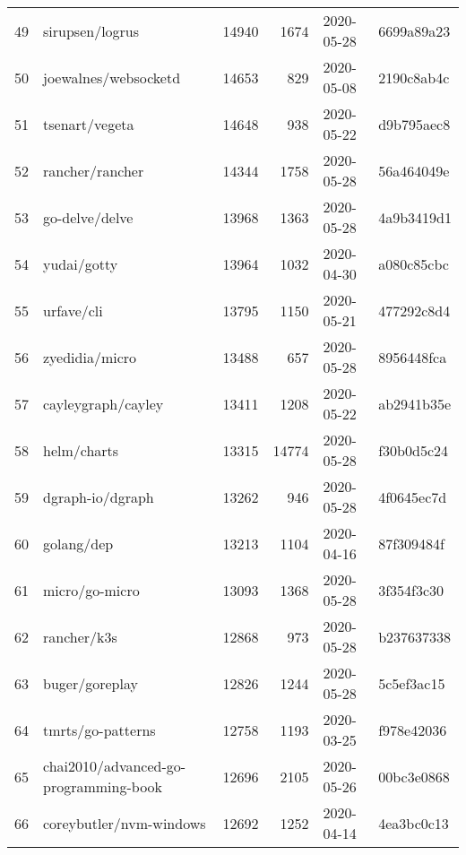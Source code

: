 \begin{longtable}{llrrll}
    49  &                                    sirupsen/logrus &  14940 &   1674 & 2020-05-28 &  6699a89a23 \\
    50  &                               joewalnes/websocketd &  14653 &    829 & 2020-05-08 &  2190c8ab4c \\
    51  &                                     tsenart/vegeta &  14648 &    938 & 2020-05-22 &  d9b795aec8 \\
    52  &                                    rancher/rancher &  14344 &   1758 & 2020-05-28 &  56a464049e \\
    53  &                                     go-delve/delve &  13968 &   1363 & 2020-05-28 &  4a9b3419d1 \\
    54  &                                        yudai/gotty &  13964 &   1032 & 2020-04-30 &  a080c85cbc \\
    55  &                                         urfave/cli &  13795 &   1150 & 2020-05-21 &  477292c8d4 \\
    56  &                                     zyedidia/micro &  13488 &    657 & 2020-05-28 &  8956448fca \\
    57  &                                 cayleygraph/cayley &  13411 &   1208 & 2020-05-22 &  ab2941b35e \\
    58  &                                        helm/charts &  13315 &  14774 & 2020-05-28 &  f30b0d5c24 \\
    59  &                                   dgraph-io/dgraph &  13262 &    946 & 2020-05-28 &  4f0645ec7d \\
    60  &                                         golang/dep &  13213 &   1104 & 2020-04-16 &  87f309484f \\
    61  &                                     micro/go-micro &  13093 &   1368 & 2020-05-28 &  3f354f3c30 \\
    62  &                                        rancher/k3s &  12868 &    973 & 2020-05-28 &  b237637338 \\
    63  &                                     buger/goreplay &  12826 &   1244 & 2020-05-28 &  5c5ef3ac15 \\
    64  &                                  tmrts/go-patterns &  12758 &   1193 & 2020-03-25 &  f978e42036 \\
    65  &              chai2010/advanced-go-programming-book &  12696 &   2105 & 2020-05-26 &  00bc3e0868 \\
    66  &                            coreybutler/nvm-windows &  12692 &   1252 & 2020-04-14 &  4ea3bc0c13 \\

\end{longtable}
